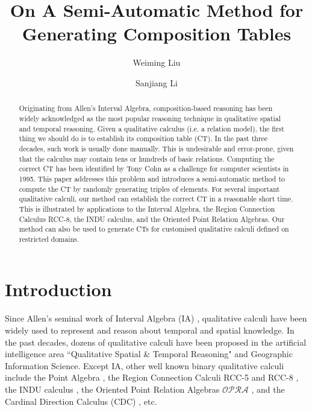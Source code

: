 \documentclass{llncs}
\title{On A Semi-Automatic Method for Generating Composition Tables
}
\author{Weiming Liu \and Sanjiang Li}
\institute{Centre for Quantum Computation and Intelligent Systems,
       Faculty of Engineering and Information Technology, University of Technology
       Sydney, Australia}
\newcommand{\opra}{\mathcal{OPRA}}
\begin{document}
\maketitle

\begin{abstract}
Originating from Allen's Interval Algebra, composition-based reasoning has been widely acknowledged as the most popular reasoning technique in qualitative spatial and temporal reasoning. Given a qualitative calculus (i.e. a relation model), the first thing we should do is to establish its composition table (CT). In the past three decades, such work is usually done manually. This is undesirable and error-prone, given that the calculus may contain tens or hundreds of basic relations. Computing the correct CT has been identified by Tony Cohn as a challenge for computer scientists in 1995. This paper addresses this problem and introduces a semi-automatic method to compute the CT by randomly generating triples of elements. For several important qualitative calculi, our method can establish the correct CT in a reasonable short time. This is illustrated by applications to the Interval Algebra, the Region Connection Calculus RCC-8, the INDU calculus, and the Oriented Point Relation Algebras. Our method can also be used to generate CTs for customised qualitative calculi defined on restricted domains.


\end{abstract}

\section{Introduction}
Since Allen's seminal work of Interval Algebra (IA)  \cite{Allen81,Allen83}, qualitative calculi have been widely used to represent and reason about temporal and spatial knowledge. In the past decades, dozens of qualitative calculi have been proposed in the artificial intelligence area ``Qualitative Spatial \& Temporal Reasoning" and Geographic Information Science. Except IA, other well known binary qualitative calculi include the Point Algebra \cite{VilainK86}, the Region Connection Calculi RCC-5 and RCC-8 \cite{RandellCC92}, the INDU calculus \cite{PujariKS99}, the Oriented Point Relation Algebras $\opra$ \cite{Moratz06}, and the Cardinal Direction Calculus (CDC) \cite{Goyal00}, etc.
\end{document}
